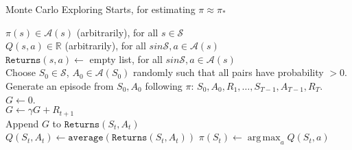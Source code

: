 \documentclass{standalone}
\DeclareMathOperator*{\argmax}{arg\,max}
\begin{document}
\pagestyle{empty}
\begin{algorithm}[H]
  \caption{Monte Carlo Exploring Starts, for estimating $\pi \approx \pi_*$}
  $\pi(s) \in \mathcal A(s)$ (arbitrarily), for all $s \in \mathcal S$ \\
  $Q(s,a) \in \mathbb R$ (arbitrarily), for all $s in \mathcal S, a \in \mathcal   A(s)$ \\
  $\texttt{Returns}(s,a) \gets$ empty list, for all $s in \mathcal S, a \in   \mathcal   A(s)$ \\
 {
  Choose $S_0 \in \mathcal S$, $A_0 \in \mathcal A(S_0)$ randomly such that all   pairs have probability $>0$. \\
  Generate an episode from $S_0, A_0$ following $\pi$: $S_0, A_0, R_1, \ldots,   S_{T-1}, A_{T-1}, R_T$.\\
  $G \gets 0$. \\
   {
    $G \gets \gamma G + R_{t+1}$ \\
     {
Append $G$ to $\texttt{Returns}(S_t, A_t)$ \\
$Q(S_t, A_t) \gets \texttt{average}(\texttt{Returns}(S_t, A_t))$ 
$\pi(S_t) \gets \argmax_a Q(S_t, a)$ \hspace{61pt} 
    }
  }
}
\end{algorithm}
\end{document}
